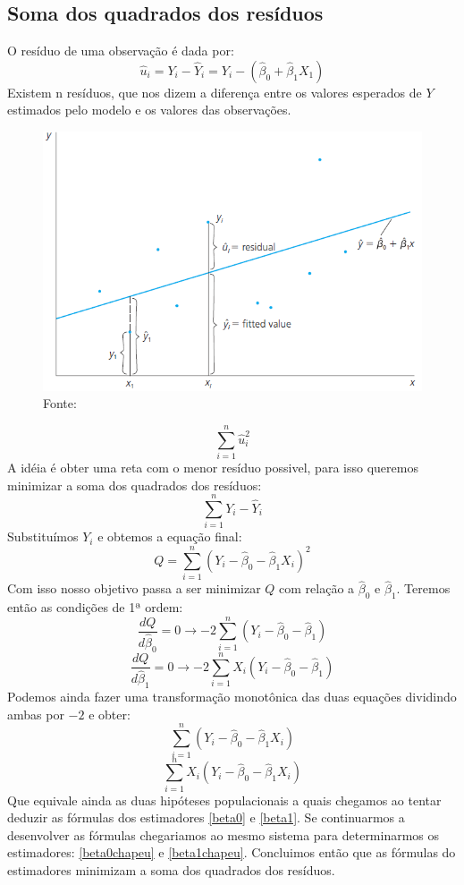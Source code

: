 \documentclass[12pt,a4paper,oneside,brazil]{abntex2}
\begin{document}
\subsection{Soma dos quadrados dos resíduos}
O resíduo de uma observação é dada por:
\[ \hat{u}_{i} = Y_i - \hat{Y}_{i} = Y_i - (\hat{\beta}_0 + \hat{\beta}_1 X_1) \]
Existem n resíduos, que nos dizem a diferença entre os valores esperados de $Y$ estimados pelo modelo e os valores das observações.
\begin{figure}[h]
\includegraphics[scale=0.7]{Residual.png}
\centering
\caption{Fonte: \cite[p. 28]{wooldridge}}
\end{figure}
\[ \sum_{i = 1}^{n} \hat{u}_i^2 \]
A idéia é obter uma reta com o menor resíduo possivel, para isso queremos minimizar a soma dos quadrados dos resíduos:
\[ \sum_{i = 1}^{n} Y_i - \hat{Y}_i\]
Substituímos $Y_i$ e obtemos a equação final:
\[  Q= \sum_{i = 1}^{n} ( Y_i - \hat{\beta}_0 - \hat{\beta}_1 X_i)^2 \]
Com isso nosso objetivo passa a ser minimizar $Q$ com relação a $\hat{\beta}_0$ e $\hat{\beta}_1$.
\clearpage
Teremos então as condições de 1ª ordem:
\[\frac{dQ}{d \hat{\beta}_0} = 0 \rightarrow -2 \sum^n_{i=1} (Y_i - \hat{\beta}_0 - \hat{\beta}_1) \]
\[ \frac{dQ}{d \hat{\beta}_1} = 0 \rightarrow  -2 \sum^n_{i=1} X_i (Y_i - \hat{\beta}_0 - \hat{\beta}_1)\]
Podemos ainda fazer uma transformação monotônica das duas equações dividindo ambas por $-2$ e obter:
 \[\sum_{i = 1}^{n} ( Y_i - \hat{\beta}_0 - \hat{\beta}_1 X_i) \]
 \[\sum_{i = 1}^{n} X_i ( Y_i - \hat{\beta}_0 - \hat{\beta}_1 X_i) \]
 Que equivale ainda as duas hipóteses populacionais a quais chegamos ao tentar deduzir as fórmulas dos estimadores \ref{beta0} e \ref{beta1}. Se continuarmos a desenvolver as fórmulas chegariamos ao mesmo sistema para determinarmos os estimadores: \ref{beta0chapeu} e \ref{beta1chapeu}. Concluimos então que as fórmulas do estimadores minimizam a soma dos quadrados dos resíduos. \newline
 
\end{document}
